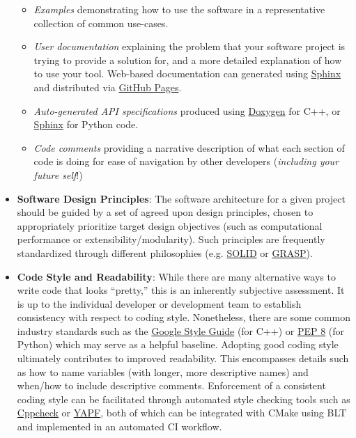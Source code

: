 \documentclass[12pt,a4paper,article,oneside]{memoir} %
\begin{document}
\begin{itemize}
\begin{itemize}
\item \textit{Examples} demonstrating how to use the software in a representative collection of common use-cases.
\item \textit{User documentation} explaining the problem that your software project is trying to provide a solution for, and a more detailed explanation of how to use your tool. Web-based documentation can generated using \href{https://www.sphinx-doc.org/en/master/}{Sphinx} and distributed via \href{https://docs.github.com/en/pages}{GitHub Pages}.
\item \textit{Auto-generated API specifications} produced using \href{https://doxygen.nl}{Doxygen} for C++, or \href{https://www.sphinx-doc.org/en/master/}{Sphinx} for Python code.
\item \textit{Code comments} providing a narrative description of what each section of code is doing for ease of navigation by other developers (\textit{including your future self}!)
\end{itemize}
\item \textbf{Software Design Principles}: The software architecture for a given project should be guided by a set of agreed upon design principles, chosen to appropriately prioritize target design objectives (such as computational performance or extensibility/modularity). Such principles are frequently standardized through different philosophies (e.g. \href{https://en.wikipedia.org/wiki/SOLID#cite_note-metz-presentation-2009-1}{SOLID} or \href{https://en.wikipedia.org/wiki/GRASP_(object-oriented_design)}{GRASP}).
\item \textbf{Code Style and Readability}: While there are many alternative ways to write code that looks ``pretty,'' this is an inherently subjective assessment. It is up to the individual developer or development team to establish consistency with respect to coding style. Nonetheless, there are some common industry standards such as the \href{https://google.github.io/styleguide/cppguide.html}{Google Style Guide} (for C++) or \href{https://peps.python.org/pep-0008/}{PEP 8} (for Python) which may serve as a helpful baseline. Adopting good coding style ultimately contributes to improved readability. This encompasses details such as how to name variables (with longer, more descriptive names) and when/how to include descriptive comments. Enforcement of a consistent coding style can be facilitated through automated style checking tools such as \href{https://cppcheck.sourceforge.io}{Cppcheck} or \href{https://github.com/google/yapf}{YAPF}, both of which can be integrated with CMake using BLT and implemented in an automated CI workflow.

\end{itemize}
\end{document}
